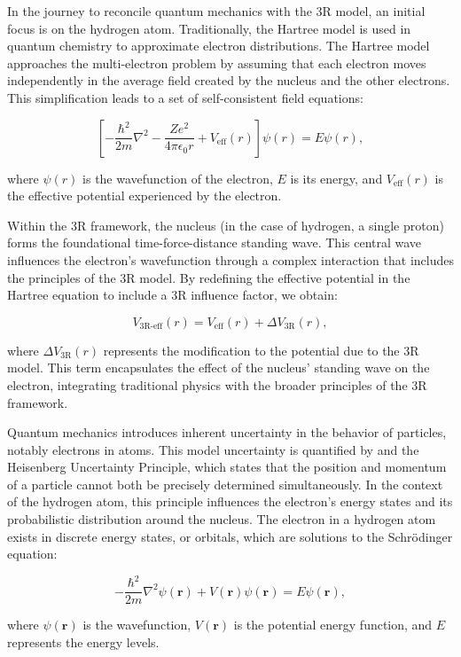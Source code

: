 \documentclass[12pt]{article}
\begin{document}
In the journey to reconcile quantum mechanics with the 3R model, an initial focus is on the hydrogen atom. Traditionally, the Hartree model is used in quantum chemistry to approximate electron distributions. The Hartree model approaches the multi-electron problem by assuming that each electron moves independently in the average field created by the nucleus and the other electrons. This simplification leads to a set of self-consistent field equations:

\[
    \left[ -\frac{\hbar^2}{2m}\nabla^2 - \frac{Ze^2}{4\pi\epsilon_0 r} + V_{\text{eff}}(r) \right] \psi(r) = E\psi(r),
\]

where \(\psi(r)\) is the wavefunction of the electron, \(E\) is its energy, and \(V_{\text{eff}}(r)\) is the effective potential experienced by the electron.

Within the 3R framework, the nucleus (in the case of hydrogen, a single proton) forms the foundational time-force-distance standing wave. This central wave influences the electron's wavefunction through a complex interaction that includes the principles of the 3R model. By redefining the effective potential in the Hartree equation to include a 3R influence factor, we obtain:

\[
    V_{\text{3R-eff}}(r) = V_{\text{eff}}(r) + \Delta V_{\text{3R}}(r),
\]

where \(\Delta V_{\text{3R}}(r)\) represents the modification to the potential due to the 3R model. This term encapsulates the effect of the nucleus' standing wave on the electron, integrating traditional physics with the broader principles of the 3R framework.

Quantum mechanics introduces inherent uncertainty in the behavior of particles, notably electrons in atoms. This model uncertainty is quantified by \qbit{} and the Heisenberg Uncertainty Principle, which states that the position and momentum of a particle cannot both be precisely determined simultaneously. In the context of the hydrogen atom, this principle influences the electron's energy states and its probabilistic distribution around the nucleus. The electron in a hydrogen atom exists in discrete energy states, or orbitals, which are solutions to the Schrödinger equation:

\[
    -\frac{\hbar^2}{2m}\nabla^2 \psi(\mathbf{r}) + V(\mathbf{r})\psi(\mathbf{r}) = E\psi(\mathbf{r}),
\]

where \(\psi(\mathbf{r})\) is the wavefunction, \(V(\mathbf{r})\) is the potential energy function, and \(E\) represents the energy levels.
\end{document}

